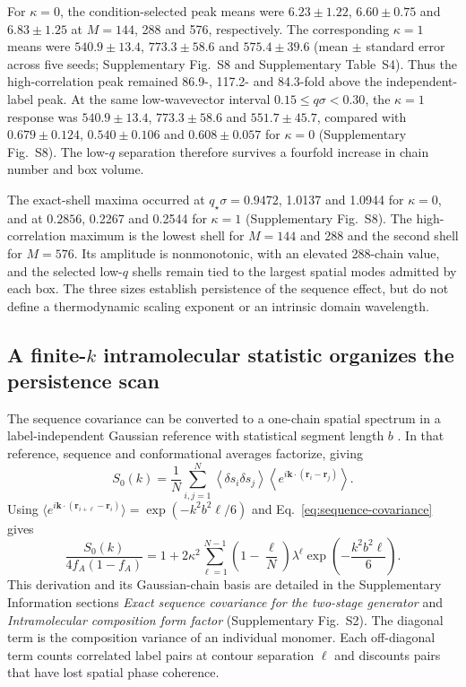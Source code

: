 \documentclass[pdflatex,sn-nature,onecolumn]{sn-jnl}
\begin{document}
For $\kappa=0$, the condition-selected peak means were $6.23\pm1.22$, $6.60\pm0.75$ and $6.83\pm1.25$ at $M=144$, 288 and 576, respectively. The corresponding $\kappa=1$ means were $540.9\pm13.4$, $773.3\pm58.6$ and $575.4\pm39.6$ (mean $\pm$ standard error across five seeds; Supplementary Fig.~S8 and Supplementary Table~S4). Thus the high-correlation peak remained 86.9-, 117.2- and 84.3-fold above the independent-label peak. At the same low-wavevector interval $0.15\le q\sigma<0.30$, the $\kappa=1$ response was $540.9\pm13.4$, $773.3\pm58.6$ and $551.7\pm45.7$, compared with $0.679\pm0.124$, $0.540\pm0.106$ and $0.608\pm0.057$ for $\kappa=0$ (Supplementary Fig.~S8). The low-$q$ separation therefore survives a fourfold increase in chain number and box volume.

The exact-shell maxima occurred at $q_\star\sigma=0.9472$, 1.0137 and 1.0944 for $\kappa=0$, and at $0.2856$, 0.2267 and 0.2544 for $\kappa=1$ (Supplementary Fig.~S8). The high-correlation maximum is the lowest shell for $M=144$ and 288 and the second shell for $M=576$. Its amplitude is nonmonotonic, with an elevated 288-chain value, and the selected low-$q$ shells remain tied to the largest spatial modes admitted by each box. The three sizes establish persistence of the sequence effect, but do not define a thermodynamic scaling exponent or an intrinsic domain wavelength.

\subsection{A finite-\texorpdfstring{$k$}{k} intramolecular statistic organizes the persistence scan}

The sequence covariance can be converted to a one-chain spatial spectrum in a label-independent Gaussian reference with statistical segment length $b$ \cite{RubinsteinColby2003}. In that reference, sequence and conformational averages factorize, giving
\begin{equation}
S_0(k)=\frac{1}{N}\sum_{i,j=1}^{N}
\left\langle\delta s_i\delta s_j\right\rangle
\left\langle e^{i\bm{k}\cdot(\bm{r}_i-\bm{r}_j)}\right\rangle.
\label{eq:s0-definition}
\end{equation}
Using $\langle e^{i\bm{k}\cdot(\bm{r}_{i+\ell}-\bm{r}_i)}\rangle=\exp(-k^2b^2\ell/6)$ and Eq.~\ref{eq:sequence-covariance} gives
\begin{equation}
\frac{S_0(k)}{4f_A(1-f_A)}=
1+2\kappa^2\sum_{\ell=1}^{N-1}
\left(1-\frac{\ell}{N}\right)\lambda^\ell
\exp\!\left(-\frac{k^2b^2\ell}{6}\right).
\label{eq:finite-form-factor}
\end{equation}
This derivation and its Gaussian-chain basis are detailed in the Supplementary Information sections \emph{Exact sequence covariance for the two-stage generator} and \emph{Intramolecular composition form factor} (Supplementary Fig.~S2). The diagonal term is the composition variance of an individual monomer. Each off-diagonal term counts correlated label pairs at contour separation $\ell$ and discounts pairs that have lost spatial phase coherence.
\end{document}
